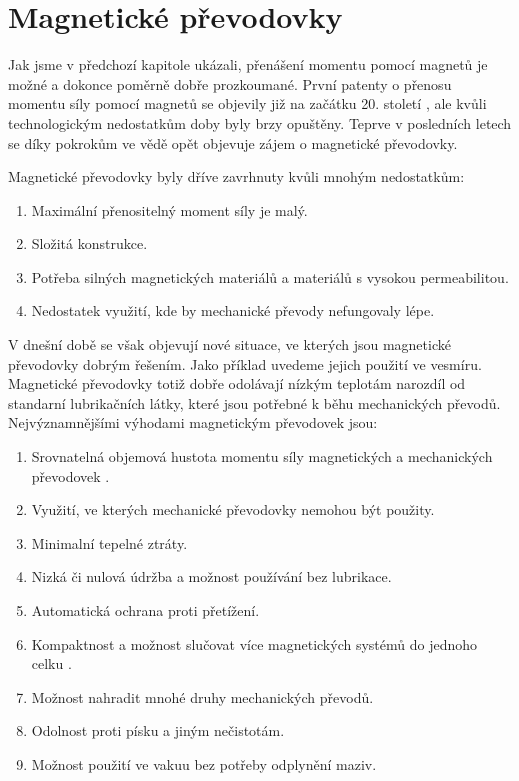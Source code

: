 \chapter{Magnetické převodovky}

Jak jsme v předchozí kapitole ukázali, přenášení momentu pomocí magnetů je možné a dokonce poměrně dobře prozkoumané. První patenty o přenosu momentu síly pomocí magnetů se objevily již na začátku 20. století \cite{patent}, ale kvůli technologickým nedostatkům doby byly brzy opuštěny. Teprve v posledních letech se díky pokrokům ve vědě opět objevuje zájem o magnetické převodovky.

Magnetické převodovky byly dříve zavrhnuty kvůli mnohým nedostatkům:

\begin{enumerate}[topsep=0pt, partopsep=0pt]
    \setlength{\itemsep}{0pt}%
    \setlength{\parskip}{0pt}%
    \item Maximální přenositelný moment síly je malý.
    \item Složitá konstrukce.
    \item Potřeba silných magnetických materiálů a materiálů s vysokou permeabilitou.
    \item Nedostatek využití, kde by mechanické převody nefungovaly lépe.
\end{enumerate}

V dnešní době se však objevují nové situace, ve kterých jsou magnetické převodovky dobrým řešením. Jako příklad uvedeme jejich použití ve vesmíru. Magnetické převodovky totiž dobře odolávají nízkým teplotám \cite{NASA_MG} narozdíl od standarní lubrikačních látky, které jsou potřebné k běhu mechanických převodů. Nejvýznamnějšími výhodami magnetickým převodovek jsou:

\begin{enumerate}[topsep=0pt, partopsep=0pt]
    \setlength{\itemsep}{0pt}%
    \setlength{\parskip}{0pt}%
    \item Srovnatelná objemová hustota momentu síly magnetických a mechanických převodovek \cite{torque_dens}.
    \item Využití, ve kterých mechanické převodovky nemohou být použity.
    \item Minimalní tepelné ztráty.
    \item Nizká či nulová údržba a možnost používání bez lubrikace.
    \item Automatická ochrana proti přetížení.
    \item Kompaktnost a možnost slučovat více magnetických systémů do jednoho celku \cite{MT_full}.
    \item Možnost nahradit mnohé druhy mechanických převodů.
    \item Odolnost proti písku a jiným nečistotám.
    \item Možnost použití ve vakuu bez potřeby odplynění maziv.
\end{enumerate}

